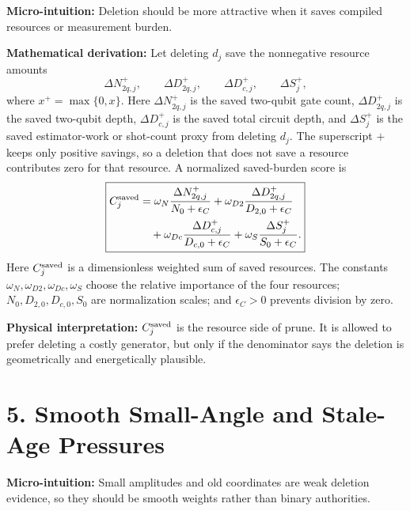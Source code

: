 \documentclass[10pt,twocolumn]{article}
\newcommand{\blk}[1]{\vspace{3pt}\noindent\textbf{#1:}\quad}
\begin{document}
\blk{Micro-intuition}
Deletion should be more attractive when it saves compiled resources or measurement burden.

\blk{Mathematical derivation}
Let deleting \(d_j\) save the nonnegative resource amounts
\[
\Delta N_{2q,j}^+,\qquad
\Delta D_{2q,j}^+,\qquad
\Delta D_{c,j}^+,\qquad
\Delta S_j^+,
\]
where \(x^+=\max\{0,x\}\).
Here \(\Delta N_{2q,j}^+\) is the saved two-qubit gate count, \(\Delta D_{2q,j}^+\) is the saved two-qubit depth, \(\Delta D_{c,j}^+\) is the saved total circuit depth, and \(\Delta S_j^+\) is the saved estimator-work or shot-count proxy from deleting \(d_j\). The superscript \(+\) keeps only positive savings, so a deletion that does not save a resource contributes zero for that resource.
A normalized saved-burden score is
\[
\boxed{
\begin{aligned}
C_j^{\rm saved}
&=
\omega_N\frac{\Delta N_{2q,j}^{+}}{N_0+\epsilon_C}
+\omega_{D2}\frac{\Delta D_{2q,j}^{+}}{D_{2,0}+\epsilon_C}
\\
&\quad
+\omega_{Dc}\frac{\Delta D_{c,j}^{+}}{D_{c,0}+\epsilon_C}
+\omega_S\frac{\Delta S_j^{+}}{S_0+\epsilon_C}.
\end{aligned}
}
\]
Here \(C_j^{\rm saved}\) is a dimensionless weighted sum of saved resources. The constants \(\omega_N,\omega_{D2},\omega_{Dc},\omega_S\) choose the relative importance of the four resources; \(N_0,D_{2,0},D_{c,0},S_0\) are normalization scales; and \(\epsilon_C>0\) prevents division by zero.

\blk{Physical interpretation}
\(C_j^{\rm saved}\) is the resource side of prune. It is allowed to prefer deleting a costly generator, but only if the denominator says the deletion is geometrically and energetically plausible.

\section*{5. Smooth Small-Angle and Stale-Age Pressures}

\blk{Micro-intuition}
Small amplitudes and old coordinates are weak deletion evidence, so they should be smooth weights rather than binary authorities.
\end{document}
